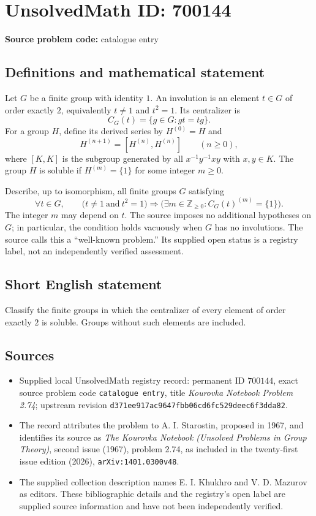 \documentclass[11pt]{article}
\newcommand{\Z}{\mathbb{Z}}
\begin{document}
\section*{UnsolvedMath ID: 700144}
\textbf{Source problem code:} catalogue entry
\subsection{Definitions and mathematical statement}
Let \(G\) be a finite group with identity \(1\). An involution is an element \(t\in G\) of order exactly \(2\), equivalently \(t\ne 1\) and \(t^2=1\). Its centralizer is
\[
C_G(t)=\{g\in G:gt=tg\}.
\]
For a group \(H\), define its derived series by \(H^{(0)}=H\) and
\[
H^{(n+1)}=[H^{(n)},H^{(n)}]\qquad(n\geq 0),
\]
where \([K,K]\) is the subgroup generated by all \(x^{-1}y^{-1}xy\) with \(x,y\in K\). The group \(H\) is soluble if \(H^{(m)}=\{1\}\) for some integer \(m\geq 0\).

Describe, up to isomorphism, all finite groups \(G\) satisfying
\[
\forall t\in G,\qquad
\bigl(t\ne 1\ \text{and}\ t^2=1\bigr)
\Longrightarrow
\bigl(\exists m\in\Z_{\geq 0}: C_G(t)^{(m)}=\{1\}\bigr).
\]
The integer \(m\) may depend on \(t\). The source imposes no additional hypotheses on \(G\); in particular, the condition holds vacuously when \(G\) has no involutions. The source calls this a ``well-known problem.'' Its supplied open status is a registry label, not an independently verified assessment.
\subsection{Short English statement}
Classify the finite groups in which the centralizer of every element of order exactly \(2\) is soluble. Groups without such elements are included.
\subsection{Sources}
\begin{itemize}
\item Supplied local UnsolvedMath registry record: permanent ID \(700144\), exact source problem code \texttt{catalogue entry}, title \emph{Kourovka Notebook Problem 2.74}; upstream revision \texttt{d371ee917ac9647fbb06cd6fc529deec6f3dda82}.
\item The record attributes the problem to A. I. Starostin, proposed in 1967, and identifies its source as \emph{The Kourovka Notebook (Unsolved Problems in Group Theory)}, second issue (1967), problem 2.74, as included in the twenty-first issue edition (2026), \texttt{arXiv:1401.0300v48}.
\item The supplied collection description names E. I. Khukhro and V. D. Mazurov as editors. These bibliographic details and the registry's open label are supplied source information and have not been independently verified.
\end{itemize}
\end{document}
